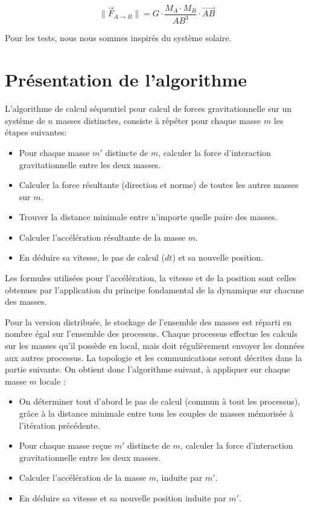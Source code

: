 \documentclass[a4paper,11pt]{article}
\begin{document}
\[
\| \vec{F}_{A\rightarrow B} \| = G \cdot \frac{M_A \cdot M_B}{\mathit{AB^3}} \cdot \mathit{\vec{AB}}
\]

Pour les tests, nous nous sommes inspirés du système solaire.

\section{Présentation de l'algorithme}
L'algorithme de calcul séquentiel pour calcul de forces gravitationnelle sur un système de $n$ masses distinctes, consiste à répéter pour chaque masse $m$ les étapes suivantes:

\begin{itemize}
\item Pour chaque masse $m'$ distincte de $m$, calculer la force d'interaction gravitationnelle entre les deux masses.
\item Calculer la force résultante (direction et norme) de toutes les autres masses sur $m$.
\item Trouver la distance minimale entre n'importe quelle paire des masses.
\item Calculer l'accélération résultante de la masse $m$.
\item En déduire sa vitesse, le pas de calcul ($dt$) et sa nouvelle position.
\end{itemize}

Les formules utilisées pour l'accélération, la vitesse et de la position sont celles obtenues par l'application du principe fondamental de la dynamique sur chacune des masses.


Pour la version distribuée,%
le stockage de l'ensemble des masses est réparti en nombre égal sur l'ensemble des processus. Chaque processus effectue les calculs sur les masses qu'il possède en local, mais doit régulièrement envoyer les données aux autres processus. La topologie et les communications seront décrites dans la partie suivante. On obtient donc l'algorithme suivant, à appliquer sur chaque masse $m$ locale :

\begin{itemize}
\item On déterminer tout d'abord le pas de calcul (commun à tout les processus), grâce à la distance minimale entre tous les couples de masses mémorisée à l'itération précédente.
\item Pour chaque masse  reçue $m'$ distincte de $m$, calculer la force d'interaction gravitationnelle entre les deux masses.
\item Calculer l'accélération de la masse $m$, induite par $m'$.
\item En déduire sa vitesse et sa nouvelle position induite par $m'$.
\end{itemize}
\end{document}
